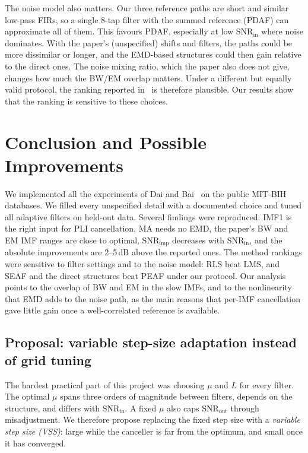 \documentclass[11pt,a4paper]{article}
\newcommand{\snrin}{\mathrm{SNR}_\mathrm{in}}
\newcommand{\snrout}{\mathrm{SNR}_\mathrm{out}}
\newcommand{\snrimp}{\mathrm{SNR}_\mathrm{imp}}
\begin{document}
The noise model also matters. Our three reference paths are short and similar low-pass FIRs, so a single 8-tap filter
with the summed reference (PDAF) can approximate all of them. This favours PDAF, especially at low $\snrin$ where
noise dominates. With the paper's (unspecified) shifts and filters, the paths could be more dissimilar or longer, and
the EMD-based structures could then gain relative to the direct ones. The noise mixing ratio, which the paper also
does not give, changes how much the BW/EM overlap matters. Under a different but equally valid protocol, the ranking
reported in~\cite{dai} is therefore plausible. Our results show that the ranking is sensitive to these choices.

\section{Conclusion and Possible Improvements}

We implemented all the experiments of Dai and Bai~\cite{dai} on the public MIT-BIH databases. We filled every
unspecified detail with a documented choice and tuned all adaptive filters on held-out data. Several findings were
reproduced: IMF1 is the right input for PLI cancellation, MA needs no EMD, the paper's BW and EM IMF ranges are close
to optimal, $\snrimp$ decreases with $\snrin$, and the absolute improvements are 2--5\,dB above the reported ones. The
method rankings were sensitive to filter settings and to the noise model: RLS beat LMS, and SEAF and the direct
structures beat PEAF under our protocol. Our analysis points to the overlap of BW and EM in the slow IMFs, and to the
nonlinearity that EMD adds to the noise path, as the main reasons that per-IMF cancellation gave little gain once a
well-correlated reference is available.

\subsection{Proposal: variable step-size adaptation instead of grid tuning}
\label{sec:vss}
The hardest practical part of this project was choosing $\mu$ and $L$ for every filter. The optimal $\mu$ spans three
orders of magnitude between filters, depends on the structure, and differs with $\snrin$. A fixed $\mu$ also caps
$\snrout$ through misadjustment. We therefore propose replacing the fixed step size with a \emph{variable step size
(VSS)}: large while the canceller is far from the optimum, and small once it has converged.
\end{document}
